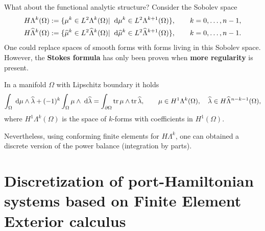 \documentclass[aspectratio=169]{beamer}
\DeclareMathOperator{\tr}{tr}
\newcommand*{\dual}[1]{\ensuremath{\widehat{#1}}}
\begin{document}
	\begin{frame}{What about the functional analytic structure?}
		Consider the Sobolev space
		\begin{equation*}
			\begin{aligned}
				H\Lambda^k(\Omega) := \{\mu^k \in L^2 \Lambda^k(\Omega) \vert \; \d{\mu^k} \in L^2 \Lambda^{k+1}(\Omega)\}, \qquad k=0, \dots, n-1, \\
				H\dual{\Lambda}^k(\Omega) := \{\dual{\mu}^k \in L^2 \dual{\Lambda}^k(\Omega) \vert \; \d{\dual{\mu}^k} \in L^2\dual{\Lambda}^{k+1}(\Omega)\}, \qquad k=0, \dots, n-1.
			\end{aligned}
		\end{equation*}
		One could replace spaces of smooth forms with forms living in this Sobolev space. \\
		However, the \textbf{Stokes formula} has only been proven when \textbf{more regularity} is present.
		\begin{theorem}
			In a manifold $\Omega$ with Lipschitz boundary it holds
			\begin{equation*}
				\int_\Omega \d{\mu} \wedge \dual{\lambda} + (-1)^k \int_\Omega \mu \wedge \d{\dual{\lambda}} = \int_{\partial \Omega}\tr {\mu} \wedge \tr{\dual{\lambda}}, \qquad \mu \in H^1\Lambda^{k}(\Omega), \quad \dual{\lambda} \in H \dual{\Lambda}^{n-k-1}(\Omega),
			\end{equation*}
			where $H^1\Lambda^k(\Omega)$ is the space of $k$-forms with coefficients in $H^1(\Omega)$.
		\end{theorem}
		
		Nevertheless, using conforming finite elements for $H\Lambda^k$, one can obtained a discrete version of the power balance (integration by parts).
		
	\end{frame}
	
	\section{Discretization of port-Hamiltonian systems based on Finite Element Exterior calculus}
	
\end{document}
